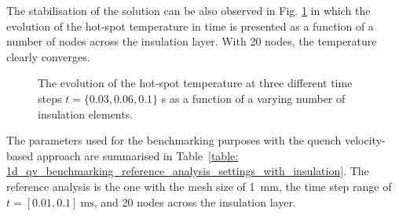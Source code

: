 The stabilisation of the solution can be also observed in Fig. \ref{fig: q_vel_modelling_v_quench_hot_spot_temp_with_insulation} in which the evolution of the hot-spot temperature in time is presented as a function of a number of nodes across the insulation layer. With 20 nodes, the temperature clearly converges.

\begin{figure}[H]
\centering
    \caption{The evolution of the hot-spot temperature at three different time steps $t=\{0.03, 0.06, 0.1\}$ s as a function of a varying number of insulation elements.}
    \label{fig: q_vel_modelling_v_quench_hot_spot_temp_with_insulation}
\end{figure}

The parameters used for the benchmarking purposes with the quench velocity-based approach are summarised in Table~\ref{table: 1d_qv_benchmarking_reference_analysis_settings_with_insulation}. The reference analysis is the one with the mesh size of 1~mm, the time step range of $t=[0.01, 0.1]~\text{ms}$, and 20 nodes across the insulation layer. 

